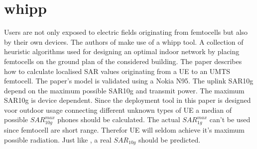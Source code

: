 

\section{whipp}
Users are not only exposed to electric fields originating from femtocells but also by their own devices. The authors of \cite{J10_RDP} make use of a \gls{whipp} tool. A collection
of heuristic algorithms used for designing an optimal indoor network by placing femtocells on the ground plan of the considered building. The paper describes how to calculate localised SAR values originating from a \gls{UE} to an UMTS femtocell.
The paper's model is validated using a Nokia N95. The uplink SAR10g depend on the maximum possible SAR10g and transmit power. The maximum SAR10g is device dependent. Since
the deployment tool in this paper is designed voor outdoor usage connecting different unknown types of \gls{UE} a median of possible $SAR^{max}_{10g}$ phones should be calculated.
The actual $SAR^{max}_{1g}$ can't be used since femtocell are short range. Therefor \gls{UE} will seldom achieve it's maximum possible radiation. Just like \cite{J10_RDP}, a real  $SAR_{10g}$ should be predicted.